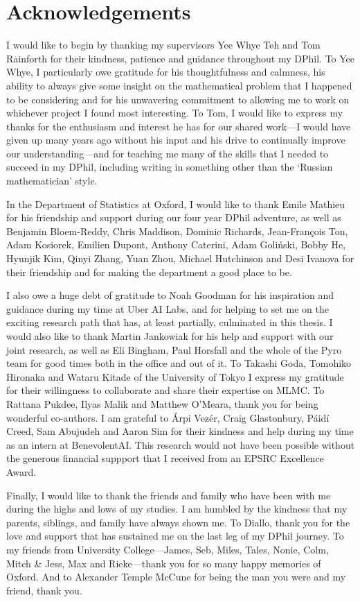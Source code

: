 \documentclass[a4paper, 10pt]{report}
\theoremstyle{plain}
\begin{document}
	\newpage
	\chapter*{Acknowledgements}
	I would like to begin by thanking my supervisors Yee Whye Teh and Tom Rainforth for their kindness, patience and guidance throughout my DPhil.
	To Yee Whye, I particularly owe gratitude for his thoughtfulness and calmness, his ability to always give some insight on the mathematical problem that I happened to be considering and for his unwavering commitment to allowing me to work on whichever project I found most interesting.
	To Tom, I would like to express my thanks for the enthusiasm and interest he has for our shared work---I would have given up many years ago without his input and his drive to continually improve our understanding---and for teaching me many of the skills that I needed to succeed in my DPhil, including writing in something other than the `Russian mathematician' style.
	
	In the Department of Statistics at Oxford, I would like to thank Emile Mathieu for his friendship and support during our four year DPhil adventure, as well as Benjamin Bloem-Reddy, Chris Maddison, Dominic Richards, Jean-François Ton, Adam Kosiorek, Emilien Dupont, Anthony Caterini, Adam Goliński, Bobby He, Hyunjik Kim, Qinyi Zhang, Yuan Zhou, Michael Hutchinson and Desi Ivanova for their friendship and for making the department a good place to be.
	
	I also owe a huge debt of gratitude to Noah Goodman for his inspiration and guidance during my time at Uber AI Labs, and for helping to set me on the exciting research path that has, at least partially, culminated in this thesis.
	I would also like to thank Martin Jankowiak for his help and support with our joint research, as well as Eli Bingham, Paul Horsfall and the whole of the Pyro team for good times both in the office and out of it.
	To Takashi Goda, Tomohiko Hironaka and Wataru Kitade of the University of Tokyo I express my gratitude for their willingness to collaborate and share their expertise on MLMC.
	To Rattana Pukdee, Ilyas Malik and Matthew O'Meara, thank you for being wonderful co-authors.
	I am grateful to Árpi Vezér, Craig Glastonbury, Páidí Creed, Sam Abujudeh and Aaron Sim for their kindness and help during my time as an intern at BenevolentAI.
	This research would not have been possible without the generous financial suppport that I received from an EPSRC Excellence Award.
	
	Finally, I would like to thank the friends and family who have been with me during the highs and lows of my studies.
	I am humbled by the kindness that my parents, siblings, and family have always shown me.
	To Diallo, thank you for the love and support that has sustained me on the last leg of my DPhil journey.
	To my friends from University College---James, Seb, Miles, Tales, Nonie, Colm, Mitch \& Jess, Max and Rieke---thank you for so many happy memories of Oxford.
	And to Alexander Temple McCune for being the man you were and my friend, thank you.
	
\end{document}
